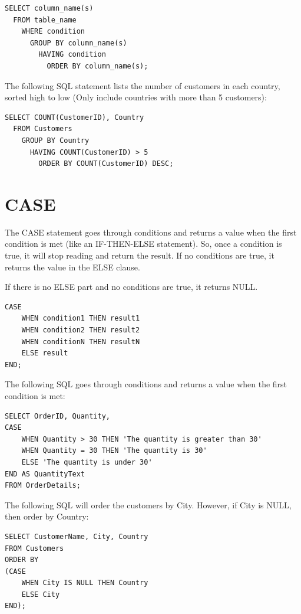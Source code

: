 \documentclass[
]{book}
\begin{document}
\begin{verbatim}
SELECT column_name(s)
  FROM table_name
    WHERE condition
      GROUP BY column_name(s)
        HAVING condition
          ORDER BY column_name(s);
\end{verbatim}

The following SQL statement lists the number of customers in each country, sorted high to low (Only include countries with more than 5 customers):

\begin{verbatim}
SELECT COUNT(CustomerID), Country
  FROM Customers
    GROUP BY Country
      HAVING COUNT(CustomerID) > 5
        ORDER BY COUNT(CustomerID) DESC;
\end{verbatim}

\hypertarget{case}{%
\section{CASE}\label{case}}

The CASE statement goes through conditions and returns a value when the first condition is met (like an IF-THEN-ELSE statement). So, once a condition is true, it will stop reading and return the result. If no conditions are true, it returns the value in the ELSE clause.

If there is no ELSE part and no conditions are true, it returns NULL.

\begin{verbatim}
CASE
    WHEN condition1 THEN result1
    WHEN condition2 THEN result2
    WHEN conditionN THEN resultN
    ELSE result
END;
\end{verbatim}

The following SQL goes through conditions and returns a value when the first condition is met:

\begin{verbatim}
SELECT OrderID, Quantity,
CASE
    WHEN Quantity > 30 THEN 'The quantity is greater than 30'
    WHEN Quantity = 30 THEN 'The quantity is 30'
    ELSE 'The quantity is under 30'
END AS QuantityText
FROM OrderDetails;
\end{verbatim}

The following SQL will order the customers by City. However, if City is NULL, then order by Country:

\begin{verbatim}
SELECT CustomerName, City, Country
FROM Customers
ORDER BY
(CASE
    WHEN City IS NULL THEN Country
    ELSE City
END);
\end{verbatim}
\end{document}
